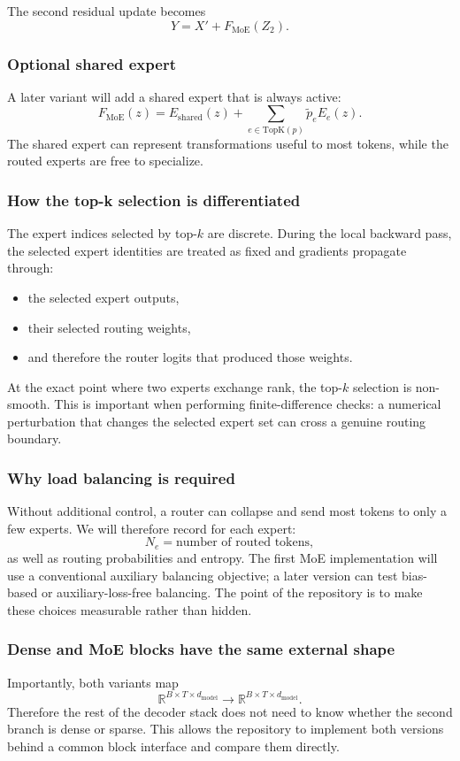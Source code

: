 \documentclass[11pt]{article}
\begin{document}
The second residual update becomes
\[
Y=X'+F_{\mathrm{MoE}}(Z_2).
\]

\subsubsection{Optional shared expert}
A later variant will add a shared expert that is always active:
\[
F_{\mathrm{MoE}}(z)
=E_{\mathrm{shared}}(z)
+\sum_{e\in\mathrm{TopK}(p)}\widetilde p_eE_e(z).
\]
The shared expert can represent transformations useful to most tokens, while the
routed experts are free to specialize.

\subsubsection{How the top-k selection is differentiated}
The expert indices selected by top-$k$ are discrete. During the local backward
pass, the selected expert identities are treated as fixed and gradients propagate
through:
\begin{itemize}[leftmargin=1.5em]
    \item the selected expert outputs,
    \item their selected routing weights,
    \item and therefore the router logits that produced those weights.
\end{itemize}
At the exact point where two experts exchange rank, the top-$k$ selection is
non-smooth. This is important when performing finite-difference checks: a numerical
perturbation that changes the selected expert set can cross a genuine routing
boundary.

\subsubsection{Why load balancing is required}
Without additional control, a router can collapse and send most tokens to only a
few experts. We will therefore record for each expert:
\[
N_e=\text{number of routed tokens},
\]
as well as routing probabilities and entropy. The first MoE implementation will
use a conventional auxiliary balancing objective; a later version can test
bias-based or auxiliary-loss-free balancing. The point of the repository is to
make these choices measurable rather than hidden.

\subsubsection{Dense and MoE blocks have the same external shape}
Importantly, both variants map
\[
\mathbb{R}^{B\times T\times d_{\mathrm{model}}}
\longrightarrow
\mathbb{R}^{B\times T\times d_{\mathrm{model}}}.
\]
Therefore the rest of the decoder stack does not need to know whether the second
branch is dense or sparse. This allows the repository to implement both versions
behind a common block interface and compare them directly.
\end{document}
